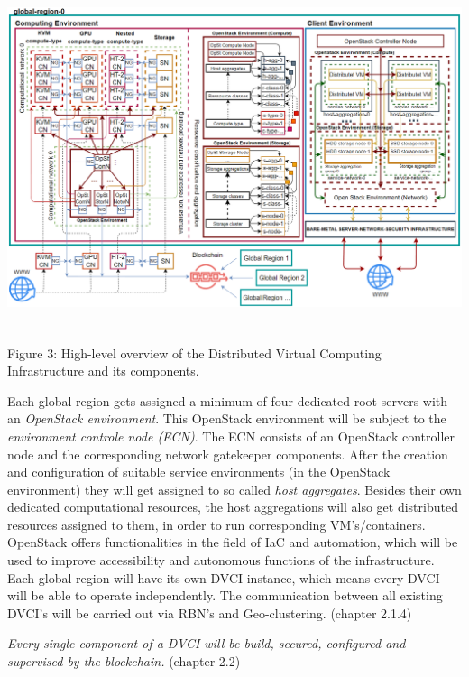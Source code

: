 \documentclass[]{article}
\begin{document}
\begin{center}
	\includegraphics[height=10cm]{dvci-arch-overview}
\end{center}
\begin{center}
	Figure 3: High-level overview of the Distributed Virtual Computing Infrastructure and its components.
\end{center}

Each global region gets assigned a minimum of four dedicated root servers with an \textit{OpenStack environment}.
This OpenStack environment will be subject to the \textit{environment controle node (ECN)}.
The ECN consists of an OpenStack controller node and the corresponding network gatekeeper components. 
After the creation and configuration of suitable service environments (in the OpenStack environment) they will get assigned to so called \textit{host aggregates}. 
Besides their own dedicated computational resources, the host aggregations will also get distributed resources assigned to them, in order to run corresponding VM's/containers.
OpenStack offers functionalities in the field of IaC and automation, which will be used to improve accessibility and autonomous functions of the infrastructure.
Each global region will have its own DVCI instance, which means every DVCI will be able to operate independently.
The communication between all existing DVCI's will be carried out via RBN's and Geo-clustering. (chapter 2.1.4)

\textit{Every single component of a DVCI will be build, secured, configured and supervised by the blockchain.} (chapter 2.2)

\end{document}

